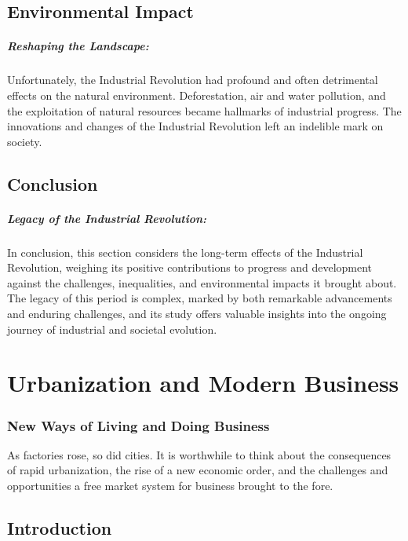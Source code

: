 \documentclass{book}
\begin{document}
\section*{Environmental Impact}

\paragraph{Reshaping the Landscape:}
Unfortunately, the Industrial Revolution had profound and often detrimental effects on the natural environment. Deforestation, air and water pollution, and the exploitation of natural resources became hallmarks of industrial progress. The innovations and changes of the Industrial Revolution left an indelible mark on society.

\section*{Conclusion}

\paragraph{Legacy of the Industrial Revolution:}
In conclusion, this section considers the long-term effects of the Industrial Revolution, weighing its positive contributions to progress and development against the challenges, inequalities, and environmental impacts it brought about. The legacy of this period is complex, marked by both remarkable advancements and enduring challenges, and its study offers valuable insights into the ongoing journey of industrial and societal evolution.

\chapter{Urbanization and Modern Business}
\subsection*{New Ways of Living and Doing Business}
As factories rose, so did cities. It is worthwhile to think about the consequences of rapid urbanization, the rise of a new economic order, and the challenges and opportunities a free market system for business brought to the fore.

\section*{Introduction}
\end{document}
